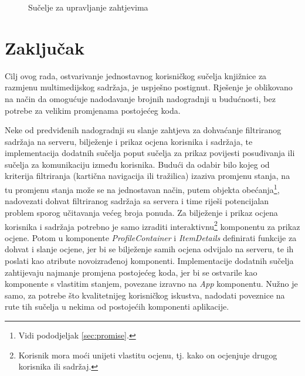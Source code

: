 \documentclass[times, utf8, zavrsni, numeric]{fer}
\newcommand{\razmaks}{\vspace{10pt}}
\begin{document}
\razmaks

\begin{figure}[htb]
\centering
{}
\caption{Sučelje za upravljanje zahtjevima}
\label{fig:screenshot-reservation}
\end{figure}

\razmaks



\chapter{Zaključak}

Cilj ovog rada, ostvarivanje jednostavnog korisničkog sučelja knjižnice za razmjenu multimedijskog sadržaja, je uspješno postignut.
Rješenje je oblikovano na način da omogućuje nadodavanje brojnih nadogradnji u budućnosti, bez potrebe za velikim promjenama postojećeg koda.

Neke od predviđenih nadogradnji su slanje zahtjeva za dohvaćanje filtriranog sadržaja na serveru, bilježenje i prikaz ocjena korisnika i sadržaja, te implementacija dodatnih sučelja poput sučelja za prikaz povijesti posuđivanja ili sučelja za komunikaciju između korisnika.
Budući da odabir bilo kojeg od kriterija filtriranja (kartična navigacija ili tražilica) izaziva promjenu stanja, na tu promjenu stanja može se na jednostavan način, putem objekta obećanja\footnote{Vidi pododjeljak \ref{sec:promise}.}, nadovezati dohvat filtriranog sadržaja sa servera i time riješi potencijalan problem sporog učitavanja većeg broja ponuda.
Za bilježenje i prikaz ocjena korisnika i sadržaja potrebno je samo izraditi interaktivnu\footnote{Korisnik mora moći unijeti vlastitu ocjenu, tj. kako on ocjenjuje drugog korisnika ili sadržaj.} komponentu za prikaz ocjene.
Potom u komponente \emph{ProfileContainer} i \emph{ItemDetails} definirati funkcije za dohvat i slanje ocjene, jer bi se bilježenje samih ocjena odvijalo na serveru, te ih poslati kao atribute novoizrađenoj komponenti.
Implementacije dodatnih sučelja zahtijevaju najmanje promjena postojećeg koda, jer bi se ostvarile kao komponente s vlastitim stanjem, povezane izravno na \emph{App} komponentu.
Nužno je samo, za potrebe što kvalitetnijeg korisničkog iskustva, nadodati poveznice na rute tih sučelja u nekima od postojećih komponenti aplikacije.
\end{document}
